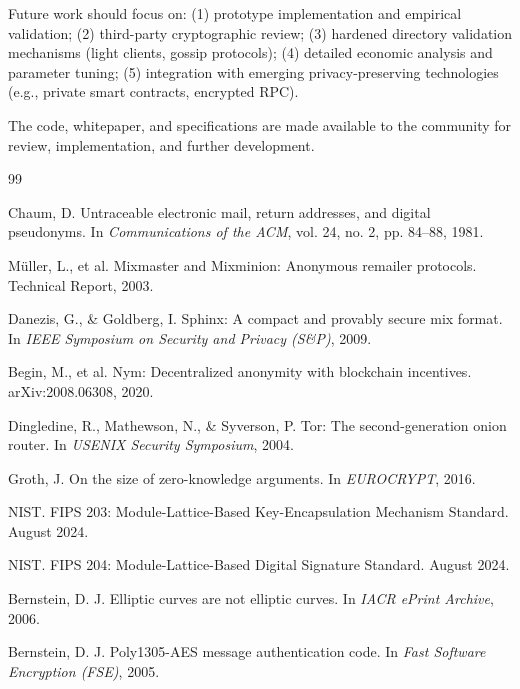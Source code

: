 \documentclass[11pt]{article}
\theoremstyle{definition}
\theoremstyle{remark}
\begin{document}
Future work should focus on: (1) prototype implementation and empirical validation; (2) third-party cryptographic review; (3) hardened directory validation mechanisms (light clients, gossip protocols); (4) detailed economic analysis and parameter tuning; (5) integration with emerging privacy-preserving technologies (e.g., private smart contracts, encrypted RPC).

The code, whitepaper, and specifications are made available to the community for review, implementation, and further development.

\newpage


\begin{thebibliography}{99}

Chaum, D.
\newblock Untraceable electronic mail, return addresses, and digital pseudonyms.
\newblock In \textit{Communications of the ACM}, vol. 24, no. 2, pp. 84--88, 1981.

Müller, L., et al.
\newblock Mixmaster and Mixminion: Anonymous remailer protocols.
\newblock Technical Report, 2003.

Danezis, G., \& Goldberg, I.
\newblock Sphinx: A compact and provably secure mix format.
\newblock In \textit{IEEE Symposium on Security and Privacy (S\&P)}, 2009.

Begin, M., et al.
\newblock Nym: Decentralized anonymity with blockchain incentives.
\newblock arXiv:2008.06308, 2020.

Dingledine, R., Mathewson, N., \& Syverson, P.
\newblock Tor: The second-generation onion router.
\newblock In \textit{USENIX Security Symposium}, 2004.

Groth, J.
\newblock On the size of zero-knowledge arguments.
\newblock In \textit{EUROCRYPT}, 2016.

NIST.
\newblock FIPS 203: Module-Lattice-Based Key-Encapsulation Mechanism Standard.
\newblock August 2024.

NIST.
\newblock FIPS 204: Module-Lattice-Based Digital Signature Standard.
\newblock August 2024.

Bernstein, D. J.
\newblock Elliptic curves are not elliptic curves.
\newblock In \textit{IACR ePrint Archive}, 2006.

Bernstein, D. J.
\newblock Poly1305-AES message authentication code.
\newblock In \textit{Fast Software Encryption (FSE)}, 2005.


\end{thebibliography}
\end{document}
